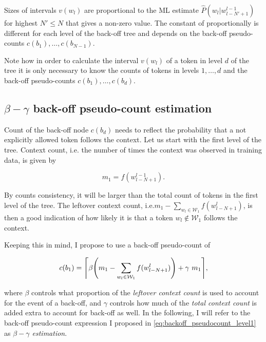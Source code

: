 \documentclass[draft]{IIBproject}
\makeatletter
\DeclarePairedDelimiter{\ceil}{\lceil}{\rceil}
\DeclarePairedDelimiter{\bracket}{(}{)}
\DeclareRobustCommand*{\ie}{i.e.\@\xspace}
\makeatother
\begin{document}
Sizes of intervals $v(w_l)$ are proportional to the ML estimate $\hat P(w_l | w_{l-N'+1}^{l-1})$ for highest $N' \le N$ that gives a non-zero value. The constant of proportionally is different for each level of the back-off tree and depends on the back-off pseudo-counts $c(b_1), \dots, c(b_{N-1})$.

Note how in order to calculate the interval $v(w_l)$ of a token in level $d$ of the tree it is only necessary to know the counts of tokens in levels $1, \dots, d$ and the back-off pseudo-counts $c(b_1), \dots, c(b_d)$.

\FloatBarrier
\subsection{$\beta{-}\gamma$ back-off pseudo-count estimation}
\label{sec:beta_gamma_backoff}

Count of the back-off node $c(b_d)$ needs to reflect the probability that a not explicitly allowed token follows the context. Let us start with the first level of the tree. Context count, \ie the number of times the context was observed in training data, is given by

\begin{equation}
\label{eq:context_count_level1}
m_1 = f(w_{l-N+1}^{l-1}) .
\end{equation}

By counts consistency, it will be larger than the total count of tokens in the first level of the tree. The leftover context count, \ie $m_1 - \sum_{w_l \in \mathcal W_1} f(w_{l-N+1}^l)$, is then a good indication of how likely it is that a token $w_l \notin \mathcal W_1$ follows the context.

Keeping this in mind, I propose to use a back-off pseudo-count of

\begin{equation}
\label{eq:backoff_pseudocount_level1} c(b_1) = \ceil*{ \beta \bracket*{ m_1 - \sum_{w_l \in \mathcal W_1} f(w_{l-N+1}^l) } + \gamma ~ m_1 },
\end{equation}

where $\beta$ controls what proportion of the \emph{leftover context count} is used to account for the event of a back-off, and $\gamma$ controls how much of the \emph{total context count} is added extra to account for back-off as well. In the following, I will refer to the back-off pseudo-count expression I proposed in \cref{eq:backoff_pseudocount_level1} as \emph{$\beta{-}\gamma$ estimation}.
\end{document}
